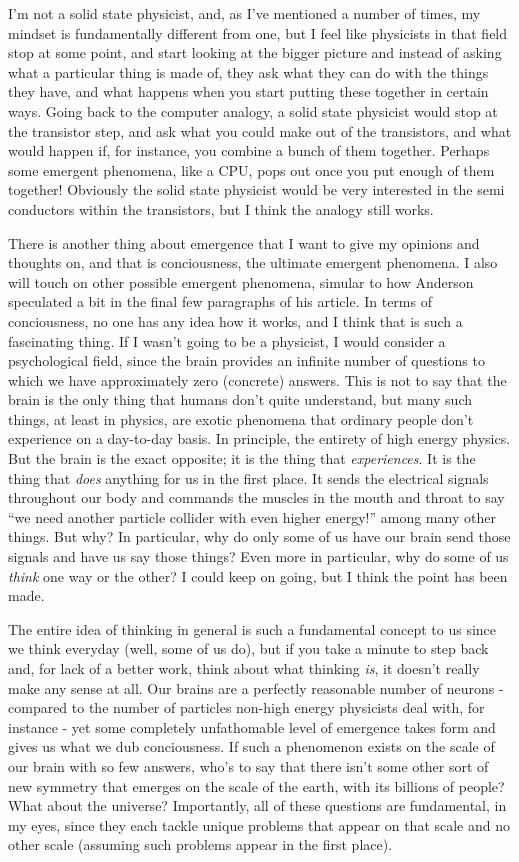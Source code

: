 I'm not a solid state physicist, and, as I've mentioned a number of times, my mindset is fundamentally different from one, but I feel like physicists in that field stop at some point, and start looking at the bigger picture and instead of asking what a particular thing is made of, they ask what they can do with the things they have, and what happens when you start putting these together in certain ways. Going back to the computer analogy, a solid state physicist would stop at the transistor step, and ask what you could make out of the transistors, and what would happen if, for instance, you combine a bunch of them together. Perhaps some emergent phenomena, like a CPU, pops out once you put enough of them together! Obviously the solid state physicist would be very interested in the semi conductors within the transistors, but I think the analogy still works.

There is another thing about emergence that I want to give my opinions and thoughts on, and that is conciousness, the ultimate emergent phenomena. I also will touch on other possible emergent phenomena, simular to how Anderson speculated a bit in the final few paragraphs of his article. In terms of conciousness, no one has any idea how it works, and I think that is such a fascinating thing. If I wasn't going to be a physicist, I would consider a psychological field, since the brain provides an infinite number of questions to which we have approximately zero (concrete) answers. This is not to say that the brain is the only thing that humans don't quite understand, but many such things, at least in physics, are exotic phenomena that ordinary people don't experience on a day-to-day basis. In principle, the entirety of high energy physics. But the brain is the exact opposite; it is the thing that \textit{experiences}. It is the thing that \textit{does} anything for us in the first place. It sends the electrical signals throughout our body and commands the muscles in the mouth and throat to say ``we need another particle collider with even higher energy!'' among many other things. But why? In particular, why do only some of us have our brain send those signals and have us say those things? Even more in particular, why do some of us \textit{think} one way or the other? I could keep on going, but I think the point has been made.

The entire idea of thinking in general is such a fundamental concept to us since we think everyday (well, some of us do), but if you take a minute to step back and, for lack of a better work, think about what thinking \textit{is}, it doesn't really make any sense at all. Our brains are a perfectly reasonable number of neurons - compared to the number of particles non-high energy physicists deal with, for instance - yet some completely unfathomable level of emergence takes form and gives us what we dub conciousness. If such a phenomenon exists on the scale of our brain with so few answers, who's to say that there isn't some other sort of new symmetry that emerges on the scale of the earth, with its billions of people? What about the universe? Importantly, all of these questions are fundamental, in my eyes, since they each tackle unique problems that appear on that scale and no other scale (assuming such problems appear in the first place).

